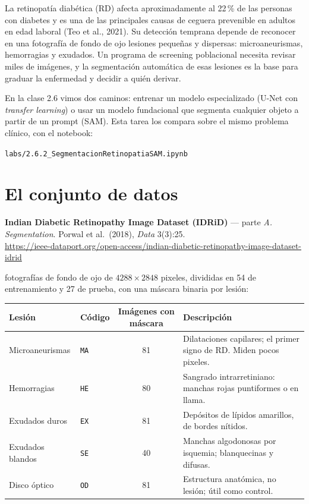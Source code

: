 \documentclass[11pt, a4paper]{article}
\begin{document}
La retinopat\'ia diab\'etica (RD) afecta aproximadamente al 22\,\% de las personas con diabetes y es una de las principales causas de ceguera prevenible en adultos en edad laboral (Teo et al., 2021). Su detecci\'on temprana depende de reconocer en una fotograf\'ia de fondo de ojo lesiones peque\~nas y dispersas: microaneurismas, hemorragias y exudados. Un programa de screening poblacional necesita revisar miles de im\'agenes, y la segmentaci\'on autom\'atica de esas lesiones es la base para graduar la enfermedad y decidir a qui\'en derivar.

En la clase 2.6 vimos dos caminos: entrenar un modelo especializado (U-Net con \emph{transfer learning}) o usar un modelo fundacional que segmenta cualquier objeto a partir de un prompt (SAM). Esta tarea los compara sobre el mismo problema cl\'inico, con el notebook:
\begin{center}\texttt{labs/2.6.2\_SegmentacionRetinopatiaSAM.ipynb}\end{center}

\section{El conjunto de datos}

\noindent\textbf{Indian Diabetic Retinopathy Image Dataset (IDRiD)} --- parte \emph{A. Segmentation}. Porwal et al.~(2018), \emph{Data} 3(3):25.\\
{\small\url{https://ieee-dataport.org/open-access/indian-diabetic-retinopathy-image-dataset-idrid}}

\vspace{0.6em}
 fotograf\'ias de fondo de ojo de $4288 \times 2848$ pixeles, divididas en 54 de entrenamiento y 27 de prueba, con una m\'ascara binaria por lesi\'on:

\vspace{0.6em}
\noindent
\begin{tabularx}{\textwidth}{@{}llcX@{}}
\toprule
\textbf{Lesi\'on} & \textbf{C\'odigo} & \textbf{Im\'agenes con m\'ascara} & \textbf{Descripci\'on}\\
\midrule
Microaneurismas   & \texttt{MA} & 81 & Dilataciones capilares; el primer signo de RD. Miden pocos pixeles.\\
Hemorragias       & \texttt{HE} & 80 & Sangrado intrarretiniano: manchas rojas puntiformes o en llama.\\
Exudados duros    & \texttt{EX} & 81 & Dep\'ositos de l\'ipidos amarillos, de bordes n\'itidos.\\
Exudados blandos  & \texttt{SE} & 40 & Manchas algodonosas por isquemia; blanquecinas y difusas.\\
\midrule
Disco \'optico    & \texttt{OD} & 81 & Estructura anat\'omica, no lesi\'on; \'util como control.\\
\bottomrule
\end{tabularx}
\end{document}
